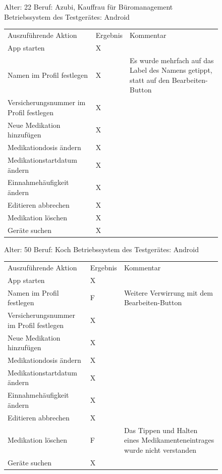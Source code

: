 \documentclass[a4paper]{scrreprt}
\begin{document}
\begin{figure}
Alter: 22 \newline
Beruf: Azubi, Kauffrau für Büromanagement \newline
Betriebssystem des Testgerätes: Android \newline \newline
 \begin{tabular}{ |l|l| p{6cm} }
  Auszuführende Aktion & Ergebnis & Kommentar \\
App starten & X & \\
Namen im Profil festlegen & X & Es wurde mehrfach auf das Label des Namens getippt, statt auf den Bearbeiten-Button \\
Versicherungsnummer im Profil festlegen & X & \\
Neue Medikation hinzufügen & X & \\
Medikationdosis ändern & X & \\
Medikationstartdatum ändern & X & \\
Einnahmehäufigkeit ändern & X & \\
Editieren abbrechen & X & \\
Medikation löschen & X & \\
Geräte suchen & X & \\
 \end{tabular}
 \newline
 \newline
 \newline
 \end{figure}
 \begin{figure}
 
 Alter: 50 \newline
Beruf: Koch \newline
Betriebssystem des Testgerätes: Android \newline \newline
 \begin{tabular}{ |l|l| p{6cm} }
  Auszuführende Aktion & Ergebnis & Kommentar \\
App starten & X & \\
Namen im Profil festlegen & F & Weitere Verwirrung mit dem Bearbeiten-Button \\
Versicherungsnummer im Profil festlegen & X & \\
Neue Medikation hinzufügen & X & \\
Medikationdosis ändern & X & \\
Medikationstartdatum ändern & X & \\
Einnahmehäufigkeit ändern & X & \\
Editieren abbrechen & X & \\
Medikation löschen & F & Das Tippen und Halten eines Medikamenteneintrages wurde nicht verstanden\\
Geräte suchen & X & \\
\end{tabular}
 \newline
 \newline
 \newline
 \end{figure}
\end{document}
